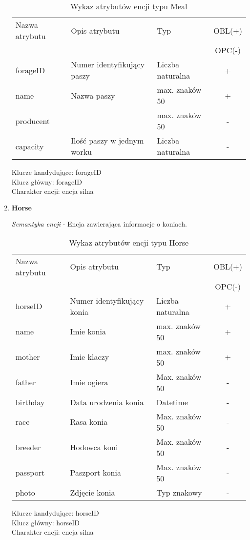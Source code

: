 \documentclass[12pt,twoside]{report}
\begin{document}
\begin{enumerate}[start=1,label={\bfseries ENC\textbackslash00\arabic*}]
	\begin{table}[h!]
		\centering
		\begin{tabular}{|l|l|l|c|}
			\hline
			Nazwa atrybutu & Opis atrybutu & Typ & OBL(+) \\
			& & &  OPC(-) \\
			\hline
			forageID & Numer identyfikujący paszy & Liczba naturalna & + \\
			\hline
			name &  Nazwa paszy & max. znaków 50 & + \\
			\hline
			producent &  & max. znaków 50 & - \\
			\hline
			capacity & Ilość paszy w jednym worku & Liczba naturalna & - \\
			\hline
		\end{tabular}
		\caption{Wykaz atrybutów encji typu Meal }
	\end{table}
	Klucze kandydujące: forageID \\
	Klucz główny: forageID \\
	Charakter encji: encja silna \\
	
	
	\item \textbf{Horse}
	
	\textit{Semantyka encji} - Encja zawierająca informacje o koniach.
	
	\begin{table}[h!]
		\centering
		\begin{tabular}{|l|l|l|c|}
			\hline
			Nazwa atrybutu & Opis atrybutu & Typ & OBL(+) \\
			& & &  OPC(-) \\
			\hline
			horseID & Numer identyfikujący konia & Liczba naturalna & + \\
			\hline
			name &  Imie konia & max. znaków 50 & + \\
			\hline
			mother &  Imie klaczy & max. znaków 50 & + \\
			\hline
			father &  Imie ogiera & Max. znaków 50 & - \\
			\hline
			birthday & Data urodzenia konia & Datetime & - \\
			\hline
			race &  Rasa konia & Max. znaków 50 & - \\
			\hline
			breeder &  Hodowca koni & Max. znaków 50 & - \\
			\hline
			passport & Paszport konia & Max. znaków 50 & - \\
			\hline
			photo & Zdjęcie konia & Typ znakowy & - \\
			\hline
		\end{tabular}
		\caption{Wykaz atrybutów encji typu Horse }
	\end{table}
	Klucze kandydujące: horseID \\
	Klucz główny: horseID \\
	Charakter encji: encja silna \\
	
\end{enumerate}
\end{document}

